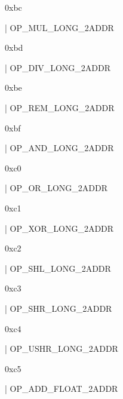 \documentclass[11pt]{article}
\begin{document}
\begin{ocamldoccomment}
0xbc
\end{ocamldoccomment}
\begin{ocamldoccode}
  | OP_MUL_LONG_2ADDR
\end{ocamldoccode}
\begin{ocamldoccomment}
0xbd
\end{ocamldoccomment}
\begin{ocamldoccode}
  | OP_DIV_LONG_2ADDR
\end{ocamldoccode}
\begin{ocamldoccomment}
0xbe
\end{ocamldoccomment}
\begin{ocamldoccode}
  | OP_REM_LONG_2ADDR
\end{ocamldoccode}
\begin{ocamldoccomment}
0xbf
\end{ocamldoccomment}
\begin{ocamldoccode}
  | OP_AND_LONG_2ADDR
\end{ocamldoccode}
\begin{ocamldoccomment}
0xc0
\end{ocamldoccomment}
\begin{ocamldoccode}
  | OP_OR_LONG_2ADDR
\end{ocamldoccode}
\begin{ocamldoccomment}
0xc1
\end{ocamldoccomment}
\begin{ocamldoccode}
  | OP_XOR_LONG_2ADDR
\end{ocamldoccode}
\begin{ocamldoccomment}
0xc2
\end{ocamldoccomment}
\begin{ocamldoccode}
  | OP_SHL_LONG_2ADDR
\end{ocamldoccode}
\begin{ocamldoccomment}
0xc3
\end{ocamldoccomment}
\begin{ocamldoccode}
  | OP_SHR_LONG_2ADDR
\end{ocamldoccode}
\begin{ocamldoccomment}
0xc4
\end{ocamldoccomment}
\begin{ocamldoccode}
  | OP_USHR_LONG_2ADDR
\end{ocamldoccode}
\begin{ocamldoccomment}
0xc5
\end{ocamldoccomment}
\begin{ocamldoccode}
  | OP_ADD_FLOAT_2ADDR
\end{ocamldoccode}
\end{document}
